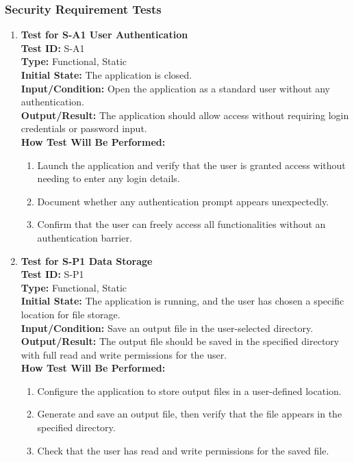 \documentclass[12pt, titlepage]{article}
\begin{document}
\subsubsection{Security Requirement Tests}
\label{S}
\begin{enumerate}
    \item \textbf{Test for S-A1 User Authentication} \\
      \newline
      \textbf{Test ID:} S-A1 \\
      \textbf{Type:} Functional, Static \\
      \textbf{Initial State:} The application is closed. \\
      \textbf{Input/Condition:} Open the application as a standard user without any authentication. \\
      \textbf{Output/Result:} The application should allow access without requiring login credentials or password input. \\
      \textbf{How Test Will Be Performed:}
      \begin{enumerate}
          \item Launch the application and verify that the user is granted access without needing to enter any login details.
          \item Document whether any authentication prompt appears unexpectedly.
          \item Confirm that the user can freely access all functionalities without an authentication barrier.
      \end{enumerate}

    \item \textbf{Test for S-P1 Data Storage} \\
      \newline
      \textbf{Test ID:} S-P1 \\
      \textbf{Type:} Functional, Static \\
      \textbf{Initial State:} The application is running, and the user has chosen a specific location for file storage. \\
      \textbf{Input/Condition:} Save an output file in the user-selected directory. \\
      \textbf{Output/Result:} The output file should be saved in the specified directory with full read and write permissions 
      for the user. \\
      \textbf{How Test Will Be Performed:}
      \begin{enumerate}
          \item Configure the application to store output files in a user-defined location.
          \item Generate and save an output file, then verify that the file appears in the specified directory.
          \item Check that the user has read and write permissions for the saved file.
      \end{enumerate}


\end{enumerate}
\end{document}

